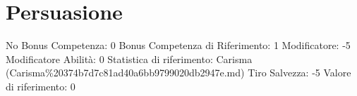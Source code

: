 \section{Persuasione}\label{persuasione}

\begin{description}
\tightlist
\item[Tags: ABI]
No Bonus Competenza: 0 Bonus Competenza di Riferimento: 1 Modificatore:
-5 Modificatore Abilità: 0 Statistica di riferimento: Carisma
(Carisma\%20374b7d7c81ad40a6bb9799020db2947e.md) Tiro Salvezza: -5
Valore di riferimento: 0
\end{description}
